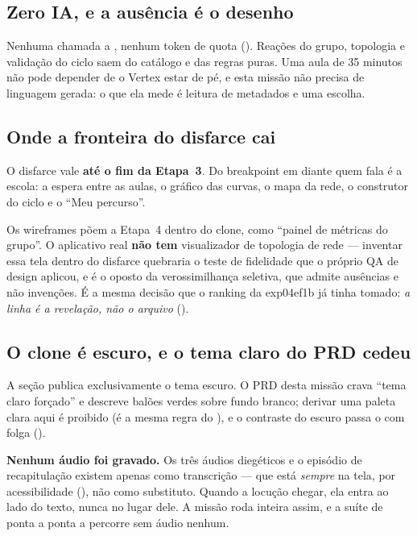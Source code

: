 \subsection{Zero IA, e a ausência é o desenho}

Nenhuma chamada a , nenhum token de quota
(). Reações do grupo, topologia e validação do ciclo saem do
catálogo e das regras puras. Uma aula de 35 minutos não pode depender de o
Vertex estar de pé, e esta missão não precisa de linguagem gerada: o que ela
mede é leitura de metadados e uma escolha.

\subsection{Onde a fronteira do disfarce cai}

O disfarce vale \textbf{até o fim da Etapa~3}. Do breakpoint em diante quem
fala é a escola: a espera entre as aulas, o gráfico das curvas, o mapa da rede,
o construtor do ciclo e o \enquote{Meu percurso}.

Os wireframes põem a Etapa~4 dentro do clone, como \enquote{painel de métricas
do grupo}. O aplicativo real \textbf{não tem} visualizador de topologia de rede
--- inventar essa tela dentro do disfarce quebraria o teste de fidelidade que o
próprio QA de design aplicou, e é o oposto da verossimilhança seletiva, que
admite ausências e não invenções. É a mesma decisão que o ranking da exp04ef1b já
tinha tomado: \emph{a linha é a revelação, não o arquivo} ().

\subsection{O clone é escuro, e o tema claro do PRD cedeu}

A seção  publica exclusivamente o tema escuro. O PRD desta
missão crava \enquote{tema claro forçado} e descreve balões verdes sobre fundo
branco; derivar uma paleta clara aqui é proibido (é a mesma regra do
), e o contraste do escuro passa o  com folga
().

\begin{limitacao}
\textbf{Nenhum áudio foi gravado.} Os três áudios diegéticos e o episódio de
recapitulação existem apenas como transcrição --- que está \emph{sempre} na
tela, por acessibilidade (), não como substituto. Quando a
locução chegar, ela entra ao lado do texto, nunca no lugar dele. A missão roda
inteira assim, e a suíte de ponta a ponta a percorre sem áudio nenhum.
\end{limitacao}

